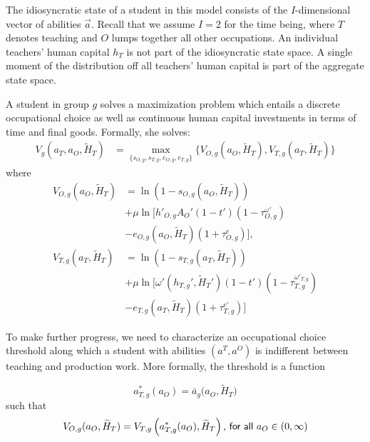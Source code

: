 \documentclass[onehalfspacing,11pt]{article}
\begin{document}
	The idiosyncratic state of a student in this model consists of the $I$-dimensional vector of abilities $\vec{a}$. Recall that we assume $I=2$ for the time being, where $T$ denotes teaching and $O$ lumps together all other occupations. An individual teachers' human capital $h_T$ is not part of the idiosyncratic state space. A single moment of the distribution off all teachers' human capital is part of the aggregate state space.
	
	A student in group $g$ solves a maximization problem which entails a discrete occupational choice as well as continuous human capital investments in terms of time and final goods. Formally, she solves:
	\begin{align}
		\label{}
		V_g(a_T,a_O,\widetilde{H}_T) & = \max_{\{s_{O,g},s_{T,g},e_{O,g},e_{T,g}\}} \bigg\{ V_{O,g}(a_O,\widetilde{H}_T), V_{T,g}(a_T,\widetilde{H}_T) \bigg\} \label{eq:V}
	\end{align}
	where
	\begin{align}
		V_{O,g}(a_O,\widetilde{H}_T) & = \ln\left(1-s_{O,g}\left(a_O,\widetilde{H}_T\right)\right) \nonumber \\
		& + \mu \ln \Big[ {{h'}_{O,g}} A_O'(1-t')(1-\tau^{\omega '}_{O,g}) \nonumber \\
		& - e_{O,g}(a_O,\widetilde{H}_T)(1+\tau^e_{O,g}) \Big], \label{eq:VO} \\
		V_{T,g}(a_T,\widetilde{H}_T) & = \ln\left(1-s_{T,g}\left(a_T,\widetilde{H}_T\right)\right) \nonumber \\
		& + \mu \ln \Big[ \omega'({h_{T,g}'},{\widetilde{H}_{T}'})(1-t')(1-\tau^{\omega'_{T,g}}_{T,g}) \nonumber \\
		& - e_{T,g}(a_T,\widetilde{H}_T)(1+\tau^{e '}_{T,g}) \Big] \label{eq:VT}
	\end{align}
	
	To make further progress, we need to characterize an occupational choice threshold along which a student with abilities $(a^T,a^O)$ is indifferent between teaching and production work. More formally, the threshold is a function
	
	\begin{equation*}
		a^*_{T,g}(a_O) = \bar{a}_g\big(a_{O},\widetilde{H}_T\big) %
	\end{equation*}
	such that
	\begin{equation}
		\label{eq:indiff}
		V_{O,g}(a_{O},\widetilde{H}_T) = V_{T,g}\left(a^*_{T,g}(a_O),\widetilde{H}_T\right) \textrm{{\sf , for all} } a_O \in (0,\infty)
	\end{equation}
	
\end{document}
